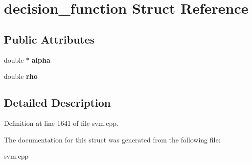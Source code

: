 \hypertarget{structdecision__function}{
\section{decision\_\-function Struct Reference}
\label{structdecision__function}
}
\subsection*{Public Attributes}
\begin{DoxyCompactItemize}
\item 
\hypertarget{structdecision__function_ab79ad1c39d091d4f8ad798abe4223772}{
double $\ast$ {\bfseries alpha}}
\label{structdecision__function_ab79ad1c39d091d4f8ad798abe4223772}

\item 
\hypertarget{structdecision__function_ae2aeeaa508803351b22d4454b81cb375}{
double {\bfseries rho}}
\label{structdecision__function_ae2aeeaa508803351b22d4454b81cb375}

\end{DoxyCompactItemize}


\subsection{Detailed Description}


Definition at line 1641 of file svm.cpp.



The documentation for this struct was generated from the following file:\begin{DoxyCompactItemize}
\item 
svm.cpp\end{DoxyCompactItemize}
